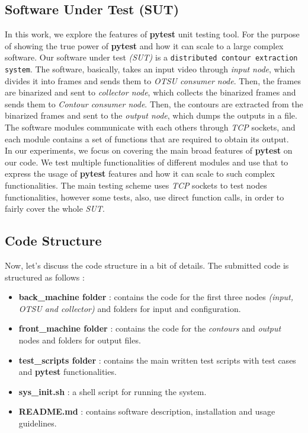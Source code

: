 \subsection{Software Under Test (SUT)}

In this work, we explore the features of \textbf{pytest} unit testing tool. For the purpose of showing the true power of \textbf{pytest} and how it can scale to a large complex software. Our software under test \emph{(SUT)} is a \texttt{distributed contour extraction system}. The software, basically, takes an input video through \emph{input node}, which divides it into frames and sends them to \emph{OTSU consumer node}. Then, the frames are binarized and sent to \emph{collector node}, which collects the binarized frames and sends them to \emph{Contour consumer node}. Then, the contours are extracted from the binarized frames and sent to the \emph{output node}, which dumps the outputs in a file. The software modules communicate with each others through \emph{TCP} sockets, and each module contains a set of functions that are required to obtain its output. \\

In our experiments, we focus on covering the main broad features of \textbf{pytest} on our code. We test multiple functionalities of different modules and use that to express the usage of \textbf{pytest} features and how it can scale to such complex functionalities. The main testing scheme uses \emph{TCP} sockets to test nodes functionalities, however some tests, also, use direct function calls, in order to fairly cover the whole \emph{SUT}.

\subsection{Code Structure}

Now, let's discuss the code structure in a bit of details. The submitted code is structured as follows :
\begin{itemize}
    \item \textbf{back\_machine folder} : contains the code for the first three nodes \emph{(input, OTSU and collector)} and folders for input and configuration.
    \item \textbf{front\_machine folder} : contains the code for the \emph{contours} and \emph{output} nodes and folders for output files.
    \item \textbf{test\_scripts folder} : contains the main written test scripts with test cases and \textbf{pytest} functionalities.
    \item \textbf{sys\_init.sh} : a shell script for running the system.
    \item \textbf{README.md} : contains software description, installation and usage guidelines.
\end{itemize}
